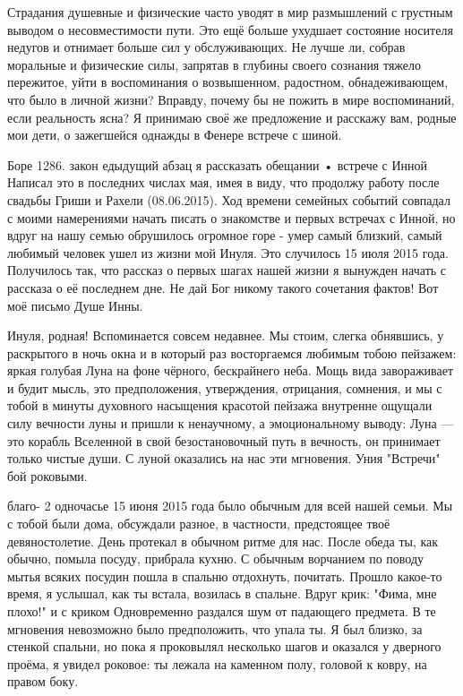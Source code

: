 \label{285-2}
Страдания душевные и физические часто уводят в мир размышлений с грустным выводом о несовместимости пути. Это ещё больше ухудшает состояние носителя недугов и отнимает больше сил у обслуживающих. Не лучше ли, собрав моральные и физические силы, запрятав в глубины своего сознания тяжело пережитое, уйти в воспоминания о возвышенном, радостном, обнадеживающем, что было в личной жизни? Вправду, почему бы не пожить в мире воспоминаний, если реальность ясна? Я принимаю своё же предложение и расскажу вам, родные мои дети, о зажегшейся однажды в Фенере встрече с шиной.

\label{286-1}
Боре 1286. закон едыдущий абзац я рассказать обещании • встрече с Инной Написал это в последних числах мая, имея в виду, что продолжу работу после свадьбы Гриши и Рахели (08.06.2015). Ход времени семейных событий совпадал с моими намерениями начать писать о знакомстве и первых встречах с Инной, но вдруг на нашу семью обрушилось огромное горе - умер самый близкий, самый любимый человек ушел из жизни мой Инуля. Это случилось 15 июля 2015 года. Получилось так, что рассказ о первых шагах нашей жизни я вынужден начать с рассказа о её последнем дне. Не дай Бог никому такого сочетания фактов! Вот моё письмо Душе Инны.

\label{287-1}
Инуля, родная!
Вспоминается совсем недавнее. Мы стоим, слегка обнявшись, у раскрытого в ночь окна и в который раз восторгаемся любимым тобою пейзажем: яркая голубая Луна на фоне чёрного, бескрайнего неба. Мощь вида завораживает и будит мысль, это предположения, утверждения, отрицания, сомнения, и мы с тобой в минуты духовного насыщения красотой пейзажа внутренне ощущали силу вечности луны и пришли к ненаучному, а эмоциональному выводу: Луна — это корабль Вселенной в свой безостановочный путь в вечность, он принимает только чистые души.
С луной оказались на нас эти мгновения. Уния "Встречи" бой роковыми.

\label{288-1}
благо- 2 одночасье 15 июня 2015 года было обычным для всей нашей семьи. Мы с тобой были дома, обсуждали разное, в частности, предстоящее твоё девяностолетие. День протекал в обычном ритме для нас. После обеда ты, как обычно, помыла посуду, прибрала кухню. С обычным ворчанием по поводу мытья всяких посудин пошла в спальню отдохнуть, почитать. Прошло какое-то время, я услышал, как ты встала, возилась в спальне. Вдруг крик: "Фима, мне плохо!" и с криком Одновременно раздался шум от падающего предмета. В те мгновения невозможно было предположить, что упала ты. Я был близко, за стенкой спальни, но пока я проковылял несколько шагов и оказался у дверного проёма, я увидел роковое: ты лежала на каменном полу, головой к ковру, на правом боку.

